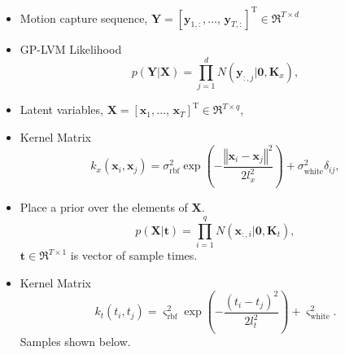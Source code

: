 \documentclass[english,color,smalltitle]{manchesterposter}
\begin{document}
\begin{multicols}{5}{\LARGE \par}
\begin{columnbox}
\-


\begin{itemize}
\item Motion capture sequence, $\mathbf{Y}=\left[\mathbf{y}_{1,:},\dots,\,\mathbf{y}_{T,:}\right]^{\mbox{T}}\in\Re^{T\times d}$ {\large \par}
\item GP-LVM Likelihood\begin{equation}
p\left(\mathbf{Y}|\mathbf{X}\right)=\prod_{j=1}^{d}N\left(\mathbf{y}_{:,j}|\mathbf{0},\mathbf{K}_{x}\right),\label{eq:gplvmLikelihood}\end{equation}
{\large \par}
\item Latent variables, $\mathbf{X}=\left[\mathbf{x}_{1},\dots,\,\mathbf{x}_{T}\right]^{\mbox{T}}\in\Re^{T\times q}$, {\large \par}
\item Kernel Matrix\[
k_{x}\left(\mathbf{x}_{i},\mathbf{x}_{j}\right)=\sigma_{\mbox{rbf}}^{2}\exp\left(-\frac{\left\Vert \mathbf{x}_{i}-\mathbf{x}_{j}\right\Vert ^{2}}{2l_{x}^{2}}\right)+\sigma_{\mbox{white}}^{2}\delta_{ij},\]
{\large \par}
\item Place a prior over the elements of $\mathbf{X}$. \begin{equation}
p\left(\mathbf{X}|\mathbf{t}\right)=\prod_{i=1}^{q}N\left(\mathbf{x}_{:,i}|\mathbf{0},\mathbf{K}_{t}\right),\label{eq:gpTemporalPrior}\end{equation}
 $\mathbf{t}\in\Re^{T\times1}$ is vector of sample times.{\large \par}
\item Kernel Matrix\[
k_{t}\left(t_{i},t_{j}\right)=\varsigma_{\mbox{rbf}}^{2}\exp\left(-\frac{\left(t_{i}-t_{j}\right)^{2}}{2l_{t}^{2}}\right)+\varsigma_{\mbox{white}}^{\mbox{2}}.\]
Samples shown below.{\large \par}
\end{itemize}
\end{columnbox}


\begin{columnbox}
\-



\end{columnbox}
\end{multicols}
\end{document}
